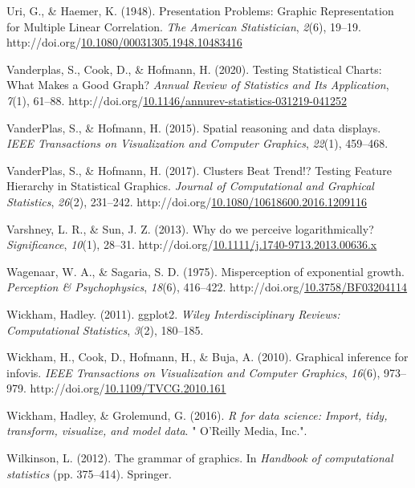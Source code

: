 \documentclass[print]{nuthesis}
\newlength{\cslhangindent}
\newenvironment{CSLReferences}%
{\setlength{\parindent}{0pt}%
\everypar{\setlength{\hangindent}{\cslhangindent}}\ignorespaces}%
{\par}
\begin{document}
\begin{CSLReferences}{1}{0}
\leavevmode\hypertarget{ref-uri_presentation_1948}{}%
Uri, G., \& Haemer, K. (1948). Presentation {Problems}: {Graphic} {Representation} for {Multiple} {Linear} {Correlation}. \emph{The American Statistician}, \emph{2}(6), 19--19. http://doi.org/\href{https://doi.org/10.1080/00031305.1948.10483416}{10.1080/00031305.1948.10483416}

\leavevmode\hypertarget{ref-vanderplas_testing_2020}{}%
Vanderplas, S., Cook, D., \& Hofmann, H. (2020). Testing {Statistical} {Charts}: {What} {Makes} a {Good} {Graph}? \emph{Annual Review of Statistics and Its Application}, \emph{7}(1), 61--88. http://doi.org/\href{https://doi.org/10.1146/annurev-statistics-031219-041252}{10.1146/annurev-statistics-031219-041252}

\leavevmode\hypertarget{ref-vanderplas2015spatial}{}%
VanderPlas, S., \& Hofmann, H. (2015). Spatial reasoning and data displays. \emph{IEEE Transactions on Visualization and Computer Graphics}, \emph{22}(1), 459--468.

\leavevmode\hypertarget{ref-vanderplas_clusters_2017}{}%
VanderPlas, S., \& Hofmann, H. (2017). Clusters {Beat} {Trend}!? {Testing} {Feature} {Hierarchy} in {Statistical} {Graphics}. \emph{Journal of Computational and Graphical Statistics}, \emph{26}(2), 231--242. http://doi.org/\href{https://doi.org/10.1080/10618600.2016.1209116}{10.1080/10618600.2016.1209116}

\leavevmode\hypertarget{ref-varshney_why_2013}{}%
Varshney, L. R., \& Sun, J. Z. (2013). Why do we perceive logarithmically? \emph{Significance}, \emph{10}(1), 28--31. http://doi.org/\href{https://doi.org/10.1111/j.1740-9713.2013.00636.x}{10.1111/j.1740-9713.2013.00636.x}

\leavevmode\hypertarget{ref-wagenaar_misperception_1975}{}%
Wagenaar, W. A., \& Sagaria, S. D. (1975). Misperception of exponential growth. \emph{Perception \& Psychophysics}, \emph{18}(6), 416--422. http://doi.org/\href{https://doi.org/10.3758/BF03204114}{10.3758/BF03204114}

\leavevmode\hypertarget{ref-wickham2011ggplot2}{}%
Wickham, Hadley. (2011). ggplot2. \emph{Wiley Interdisciplinary Reviews: Computational Statistics}, \emph{3}(2), 180--185.

\leavevmode\hypertarget{ref-wickham_graphical_2010}{}%
Wickham, H., Cook, D., Hofmann, H., \& Buja, A. (2010). Graphical inference for infovis. \emph{IEEE Transactions on Visualization and Computer Graphics}, \emph{16}(6), 973--979. http://doi.org/\href{https://doi.org/10.1109/TVCG.2010.161}{10.1109/TVCG.2010.161}

\leavevmode\hypertarget{ref-wickham2016r}{}%
Wickham, Hadley, \& Grolemund, G. (2016). \emph{R for data science: Import, tidy, transform, visualize, and model data}. " O'Reilly Media, Inc.".

\leavevmode\hypertarget{ref-wilkinson2012grammar}{}%
Wilkinson, L. (2012). The grammar of graphics. In \emph{Handbook of computational statistics} (pp. 375--414). Springer.

\end{CSLReferences}
\end{document}
